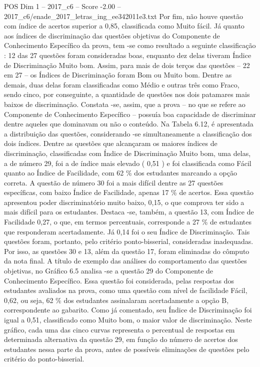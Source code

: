 \begin{textsample}{POS Dim 1 – 2017\_c6 – Score -2.00 – 2017\_c6/enade\_2017\_letras\_ing\_ee342011e3.txt}
Por fim, não houve questão com índice de acertos superior a 0,85, classificada como Muito fácil.
Já quanto aos índices de discriminação das questões objetivas do Componente de Conhecimento Específico da prova, tem -se como resultado a seguinte classificação : 12 das 27 questões foram consideradas boas, enquanto dez delas tiveram Índice de Discriminação Muito bom.
Assim, para mais de dois terços das questões – 22 em 27 – os Índices de Discriminação foram Bom ou Muito bom.
Dentre as demais, duas delas foram classificadas como Médio e outras três como Fraco, sendo cinco, por conseguinte, a quantidade de questões nos dois patamares mais baixos de discriminação.
Constata -se, assim, que a prova – no que se refere ao Componente de Conhecimento Específico – possuía boa capacidade de discriminar dentre aqueles que dominavam ou não o conteúdo.
Na Tabela 6.12, é apresentada a distribuição das questões, considerando -se simultaneamente a classificação dos dois índices.
Dentre as questões que alcançaram os maiores índices de discriminação, classificadas com Índice de Discriminação Muito bom, uma delas, a de número 29, foi a de índice mais elevado ( 0,51 ) e foi classificada como Fácil quanto ao Índice de Facilidade, com 62 \% dos estudantes marcando a opção correta.
A questão de número 30 foi a mais difícil dentre as 27 questões específicas, com baixo Índice de Facilidade, apenas 17 \% de acertos.
Essa questão apresentou poder discriminatório muito baixo, 0,15, o que comprova ter sido a mais difícil para os estudantes.
Destaca -se, também, a questão 13, com Índice de Facilidade 0,27, o que, em termos percentuais, corresponde a 27 \% de estudantes que responderam acertadamente.
Já 0,14 foi o seu Índice de Discriminação.
Tais questões foram, portanto, pelo critério ponto-bisserial, consideradas inadequadas.
Por isso, as questões 30 e 13, além da questão 17, foram eliminadas do cômputo da nota final.
A título de exemplo das análises do comportamento das questões objetivas, no Gráfico 6.5 analisa -se a questão 29 do Componente de Conhecimento Específico.
Essa questão foi considerada, pelas respostas dos estudantes avaliados na prova, como uma questão com nível de facilidade Fácil, 0,62, ou seja, 62 \% dos estudantes assinalaram acertadamente a opção B, correspondente ao gabarito.
Como já comentado, seu Índice de Discriminação foi igual a 0,51, classificado como Muito bom, o maior valor de discriminação.
Neste gráfico, cada uma das cinco curvas representa o percentual de respostas em determinada alternativa da questão 29, em função do número de acertos dos estudantes nessa parte da prova, antes de possíveis eliminações de questões pelo critério do ponto-bisserial.

\end{textsample}
